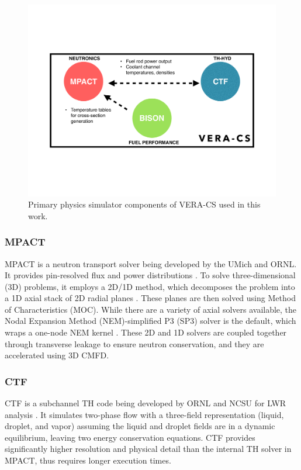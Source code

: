 \documentclass[edeposit,fullpage,12pt]{uiucthesis2009}
\begin{document}
\begin{figure}
\begin{center}
\includegraphics[width=0.5\linewidth,trim={2cm 5cm 2cm 5cm}]{./Figures/VERA-CS-Figure.pdf}
\end{center}
\caption{Primary physics simulator components of VERA-CS used in this work.}
\label{fig:workflow}
\end{figure} 

\subsubsection{MPACT}
MPACT is a neutron transport solver being developed by the \gls{UMich} and \gls{ORNL}. 
It provides pin-resolved flux and power distributions \cite{kochunas_overview_2013}. 
To solve three-dimensional (3D) problems, it employs a 2D/1D method, which decomposes the problem into a 1D axial stack of 2D radial planes \cite{zhu_assessment_2014}. 
These planes are then solved using Method of Characteristics (MOC). 
While there are a variety of axial solvers available, the Nodal Expansion Method (NEM)-simplified P3 (SP3) solver is the default, which wraps a one-node NEM kernel \cite{stimpson_axial_2014}. 
These 2D and 1D solvers are coupled together through transverse leakage to ensure neutron conservation, and they are accelerated using 3D \gls{CMFD}. 

\subsubsection{CTF}
CTF is a subchannel TH code being developed by \gls{ORNL} and \gls{NCSU} for LWR analysis \cite{avramova_ctf:_2009}. 
It simulates two-phase flow with a three-field representation (liquid, droplet, and vapor) assuming the liquid and droplet fields are in a dynamic equilibrium, leaving two energy conservation equations. 
CTF provides significantly higher resolution and physical detail than the internal TH solver in MPACT, thus requires longer execution times. 
\end{document}
